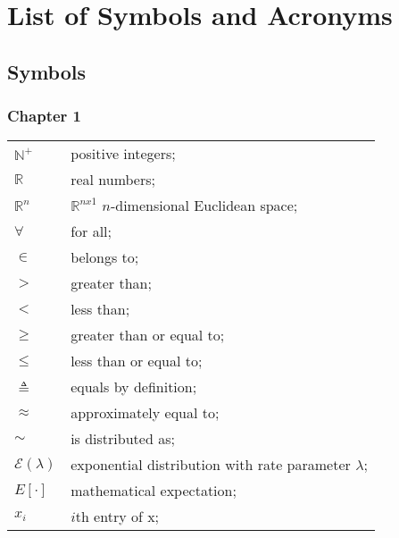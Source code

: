 \chapter*{List of Symbols and Acronyms}
\section*{Symbols}

\setlength{\LTleft}{10pt}

\subsection*{Chapter 1}

\begin{longtable}{ll}
	$\mathbb{N}^+$			& positive integers; \\
	$\mathbb{R}$			& real numbers; \\
	$\mathbb{R}^n$			& $\mathbb{R}^{nx1}$ $n$-dimensional Euclidean space; \\
	
	$\forall$				& for all; \\
	$\in$					& belongs to; \\
	$>$						& greater than; \\
	$<$						& less than; \\
	$\geq$					& greater than or equal to; \\
	$\leq$					& less than or equal to; \\
	$\triangleq$			& equals by definition; \\	
	$\approx$				& approximately equal to; \\
	$\sim$					& is distributed as; \\
	

	$\mathcal{E}(\lambda)$	& exponential distribution with rate parameter $\lambda$; \\
	$E[\mathord{\cdot}]$	& mathematical expectation; \\
	$x_i$					& $i$th entry of x; \\	
	

\end{longtable}
